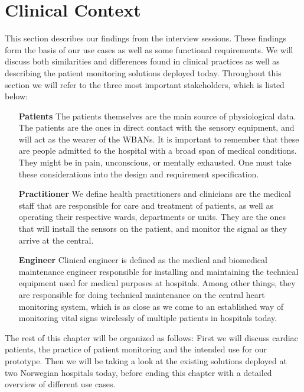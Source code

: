 \section{Clinical Context} %
\label{sec:clinical_context}

This section describes our findings from the interview sessions. These findings form the basis of our use cases as well as some functional requirements. We will discuss both similarities and differences found in clinical practices as well as describing the patient monitoring solutions deployed today. Throughout this section we will refer to the three most important stakeholders, which is listed below:

\begin{itemize}

  \item[\textbf{Patients}] The patients themselves are the main source of physiological data. The patients are the ones in direct contact with the sensory equipment, and will act as the wearer of the WBANs. It is important to remember that these are people admitted to the hospital with a broad span of medical conditions. They might be in pain, unconscious, or mentally exhausted. One must take these considerations into the design and requirement specification.
  
  \item[\textbf{Practitioner}] We define health practitioners and clinicians are the medical staff that are responsible for care and treatment of patients, as well as operating their respective wards, departments or units. They are the ones that will install the sensors on the patient, and monitor the signal as they arrive at the central.

  \item[\textbf{Engineer}] Clinical engineer is defined as the medical and biomedical maintenance engineer responsible for installing and maintaining the technical equipment used for medical purposes at hospitals. Among other things, they are responsible for doing technical maintenance on the central heart monitoring system, which is as close as we come to an established way of monitoring vital signs wirelessly of multiple patients in hospitals today.

\end{itemize}

The rest of this chapter will be organized as follows: First we will discuss cardiac patients, the practice of patient monitoring and the intended use for our prototype. Then we will be taking a look at the existing solutions deployed at two Norwegian hospitals today, before ending this chapter with a detailed overview of different use cases.

